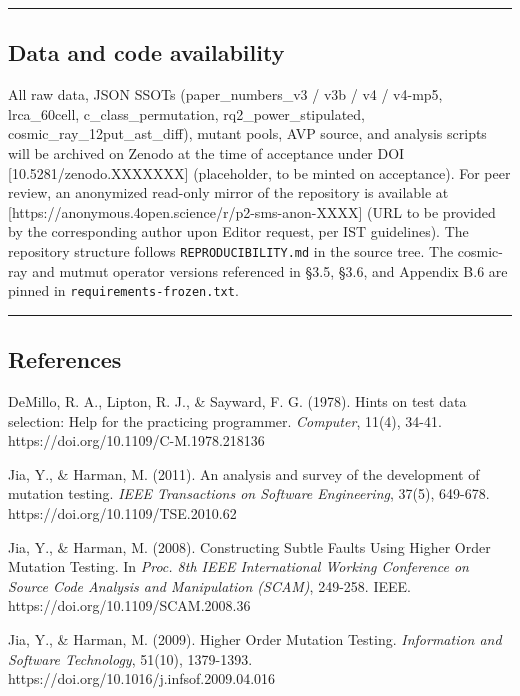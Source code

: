 \documentclass[review,12pt,authoryear]{elsarticle}
\begin{document}
\begin{center}\rule{0.5\linewidth}{0.5pt}\end{center}

\subsection{Data and code
availability}\label{data-and-code-availability}

All raw data, JSON SSOTs (paper\_numbers\_v3 / v3b / v4 / v4-mp5,
lrca\_60cell, c\_class\_permutation, rq2\_power\_stipulated,
cosmic\_ray\_12put\_ast\_diff), mutant pools, AVP source, and analysis
scripts will be archived on Zenodo at the time of acceptance under DOI
{[}10.5281/zenodo.XXXXXXX{]} (placeholder, to be minted on acceptance).
For peer review, an anonymized read-only mirror of the repository is
available at {[}https://anonymous.4open.science/r/p2-sms-anon-XXXX{]}
(URL to be provided by the corresponding author upon Editor request, per
IST guidelines). The repository structure follows
\texttt{REPRODUCIBILITY.md} in the source tree. The cosmic-ray and
mutmut operator versions referenced in §3.5, §3.6, and Appendix B.6 are
pinned in \texttt{requirements-frozen.txt}.

\begin{center}\rule{0.5\linewidth}{0.5pt}\end{center}

\subsection{References}\label{references}

DeMillo, R. A., Lipton, R. J., \& Sayward, F. G. (1978). Hints on test
data selection: Help for the practicing programmer. \emph{Computer},
11(4), 34-41. https://doi.org/10.1109/C-M.1978.218136

Jia, Y., \& Harman, M. (2011). An analysis and survey of the development
of mutation testing. \emph{IEEE Transactions on Software Engineering},
37(5), 649-678. https://doi.org/10.1109/TSE.2010.62

Jia, Y., \& Harman, M. (2008). Constructing Subtle Faults Using Higher
Order Mutation Testing. In \emph{Proc. 8th IEEE International Working
Conference on Source Code Analysis and Manipulation (SCAM)}, 249-258.
IEEE. https://doi.org/10.1109/SCAM.2008.36

Jia, Y., \& Harman, M. (2009). Higher Order Mutation Testing.
\emph{Information and Software Technology}, 51(10), 1379-1393.
https://doi.org/10.1016/j.infsof.2009.04.016
\end{document}
